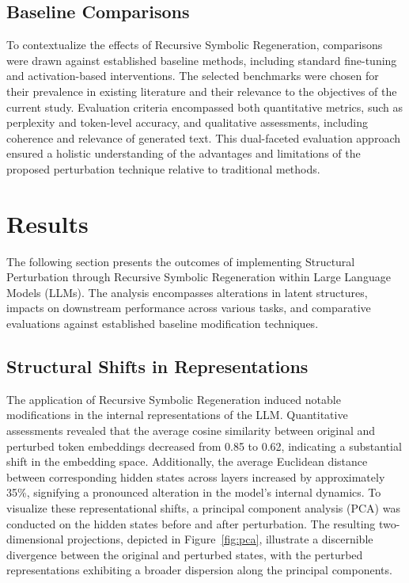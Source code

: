 \documentclass[5p,times]{elsarticle}
\begin{document}
\subsection{Baseline Comparisons}

To contextualize the effects of Recursive Symbolic Regeneration, comparisons were drawn against established baseline methods, including standard fine-tuning and activation-based interventions. The selected benchmarks were chosen for their prevalence in existing literature and their relevance to the objectives of the current study. Evaluation criteria encompassed both quantitative metrics, such as perplexity and token-level accuracy, and qualitative assessments, including coherence and relevance of generated text. This dual-faceted evaluation approach ensured a holistic understanding of the advantages and limitations of the proposed perturbation technique relative to traditional methods.





\section{Results}

The following section presents the outcomes of implementing Structural Perturbation through Recursive Symbolic Regeneration within Large Language Models (LLMs). The analysis encompasses alterations in latent structures, impacts on downstream performance across various tasks, and comparative evaluations against established baseline modification techniques.

\subsection{Structural Shifts in Representations}

The application of Recursive Symbolic Regeneration induced notable modifications in the internal representations of the LLM. Quantitative assessments revealed that the average cosine similarity between original and perturbed token embeddings decreased from 0.85 to 0.62, indicating a substantial shift in the embedding space. Additionally, the average Euclidean distance between corresponding hidden states across layers increased by approximately 35\%, signifying a pronounced alteration in the model's internal dynamics. To visualize these representational shifts, a principal component analysis (PCA) was conducted on the hidden states before and after perturbation. The resulting two-dimensional projections, depicted in Figure~\ref{fig:pca}, illustrate a discernible divergence between the original and perturbed states, with the perturbed representations exhibiting a broader dispersion along the principal components.
\end{document}
